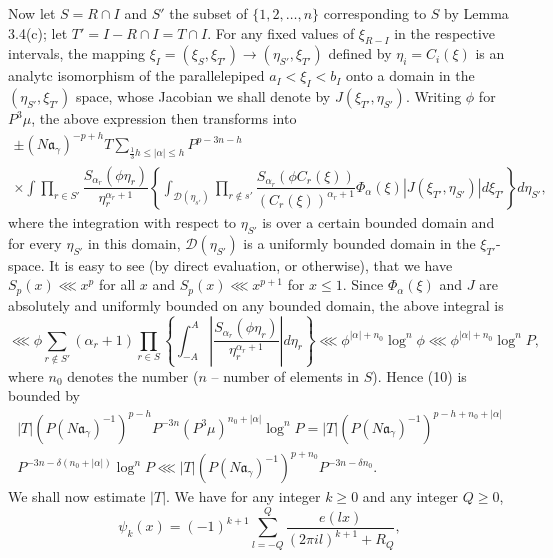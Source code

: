Now let $S = R \cap I$ and $S'$ the subset of $\{1, 2, \ldots, n\}$ corresponding to $S$ by Lemma 3.4(c); let $T' = I - R \cap I= T \cap I$. For any fixed values of $\xi_{R-I}$ in the respective intervals, the mapping $\xi_I = (\xi_S, \xi_{T'}) \to (\eta_{S'}, \xi_{T'})$ defined by $\eta_i = C_i (\xi)$ is an analytc isomorphism of the parallelepiped $a_I < \xi_I < b_I$ onto a domain in the $(\eta_{S'}, \xi_{T'})$ space, whose Jacobian we shall denote by $J (\xi_{T'}, \eta_{S'})$. Writing $\phi$ for $P^3 \mu$, the above expression then transforms into
{\fontsize{09}{11}\selectfont
\begin{multline*}
\pm (N\mathfrak{a}_\gamma)^{-p+h} T \sum\limits_{\frac{1}{3} h\leq |\alpha| \leq h} P^{p-3n-h}\\
 \times \int \prod\limits_{r \in S'} \dfrac{S_{\alpha_r} (\phi \eta_r)}{\eta^{\alpha_r+1}_r} \left\{ \int_{\mathscr{D} (\eta_{s'})} \prod\limits_{r\notin s'} \dfrac{S_{\alpha_r} (\phi C_r (\xi))}{(C_r (\xi))^{\alpha_r +1}} \Phi_\alpha (\xi)|J (\xi_{T'}, \eta_{S'})| d \xi_{T'} \right\} d\eta_{S'},
\end{multline*}}
where the integration with respect to $\eta_{S'}$ is over a certain bounded domain and for every $\eta_{S'}$ in this domain, $\mathscr{D}(\eta_{S'})$ is a uniformly bounded domain in the $\xi_{T'}$-space. It is easy to see (by direct evaluation, or otherwise), that we have $S_p(x) \lll x^p$ for all $x$ and $S_p(x)\lll x^{p+1}$ for $x \leq 1$. Since $\Phi_\alpha (\xi)$ and $J$ are absolutely and uniformly bounded on any bounded domain, the above integral is 
{\fontsize{09}{11}\selectfont
$$
\lll \phi \sum\limits_{r \notin S'} (\alpha_r + 1) \prod\limits_{r \in S} \left\{\int^{A}_{-A} |\dfrac{S_{\alpha_r} (\phi \eta_r)}{\eta^{\alpha_r+1}_r}|  d \eta_r\right\} \lll \phi^{|\alpha|+ n_0} \log^n \phi \lll \phi^{|\alpha|+n_0} \log^n P,
$$}\relax
where $n_0$ denotes the number ($n$ -- number of elements in $S$). Hence (10) is bounded by 
{\fontsize{10}{11}\selectfont
\begin{multline*}
|T| (P(N\mathfrak{a}_\gamma)^{-1})^{p-h} P^{-3n} (P^3 \mu)^{n_0+ |\alpha|} \log^n P = |T| (P(N\mathfrak{a}_\gamma)^{-1})^{p-h+n_0+|\alpha|}\\
 P^{-3n-\delta(n_0+|\alpha|)} \log^n P \lll |T| (P(N\mathfrak{a}_\gamma)^{-1})^{p+n_0} P^{-3n-\delta n_0}.
\end{multline*}}
\indent
We shall now estimate $|T|$. We have for any integer $k \geq 0$ and any integer $Q \geq 0$,
$$
\psi_k(x) = (-1)^{k+1} \sum\limits^{Q}_{l=-Q} \dfrac{e(lx)}{(2\pi il)^{k+1} + R_Q}, 
$$
